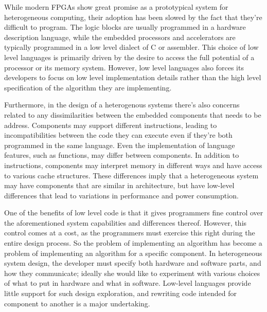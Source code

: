 While modern FPGAs show great promise as a prototypical system for heterogeneous computing, their adoption has been slowed by the fact that they're difficult to program. The logic blocks are usually programmed in a hardware description language, while the embedded processors and accelerators are typically programmed in a low level dialect of C or assembler.  This choice of low level languages is primarily driven by the desire to access the full potential of a processor or its memory system. However, low level languages also forces its developers to focus on low level implementation details rather than the high level specification of the algorithm they are implementing.

Furthermore, in the design of a heterogenous systems there's also concerns related to any dissimilarities between the embedded components that needs to be address. Components may support different instructions, leading to incompatibilities between the code they can execute even if they're both programmed in the same language. Even the implementation of language features, such as functions, may differ between components. In addition to instructions, components may interpret memory in different ways and have access to various cache structures. These differences imply that a heterogeneous system may have components that are similar in architecture, but have low-level differences that lead to variations in performance and power consumption.

One of the benefits of low level code is that it gives programmers fine control over the aforementioned system capabilities and differences thereof. However, this control comes at a cost, as the programmers must exercise this right during the entire design process. So the problem of implementing an algorithm has become a problem of implementing an algorithm for a specific component. In heterogeneous system design, the developer must specify both hardware and software parts, and how they communicate; ideally she would like to experiment with various choices of what to put in hardware and what in software. Low-level languages provide little support for such design exploration, and rewriting code intended for component to another is a major undertaking.

%
%


